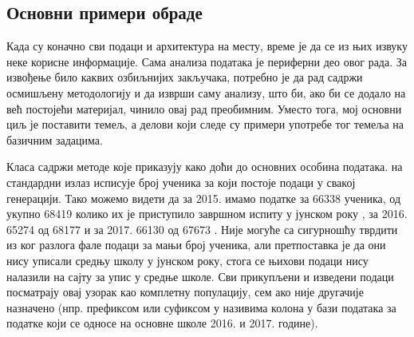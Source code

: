 \subsection{Основни примери обраде}\label{subs:osn_obrada}

Када су коначно сви подаци и архитектура на месту, време је да се из њих извуку неке корисне информације. Сама анализа података је периферни део овог рада. За извођење било каквих озбиљнијих закључака, потребно је да рад садржи осмишљену методологију и да изврши саму анализу, што би, ако би се додало на већ постојећи материјал, чинило овај рад преобимним. Уместо тога, мој основни циљ је поставити темељ, а делови који следе су примери употребе тог темеља на базичним задацима.

Класа  садржи методе које приказују како доћи до основних особина података.  на стандардни излаз исписује број ученика за који постоје подаци у свакој генерацији. Тако можемо видети да за 2015. имамо податке за 66338 ученика, од укупно 68419 колико их је приступило завршном испиту у јунском року \citep{izvestaj15}, за 2016. 65274 од 68177 \citep{izvestaj16manjine} и за 2017. 66130 од 67673 \citep{izvestaj17manjine}. Није могуће са сигурношћу тврдити из ког разлога фале подаци за мањи број ученика, али претпоставка је да они нису уписали средњу школу у јунском року, стога се њихови подаци нису налазили на сајту за упис у средње школе. Сви прикупљени и изведени подаци посматрају овај узорак као комплетну популацију, сем ако није другачије назначено (нпр. префиксом  или суфиксом  у називима колона у бази података за податке који се односе на основне школе 2016. и 2017. године).


